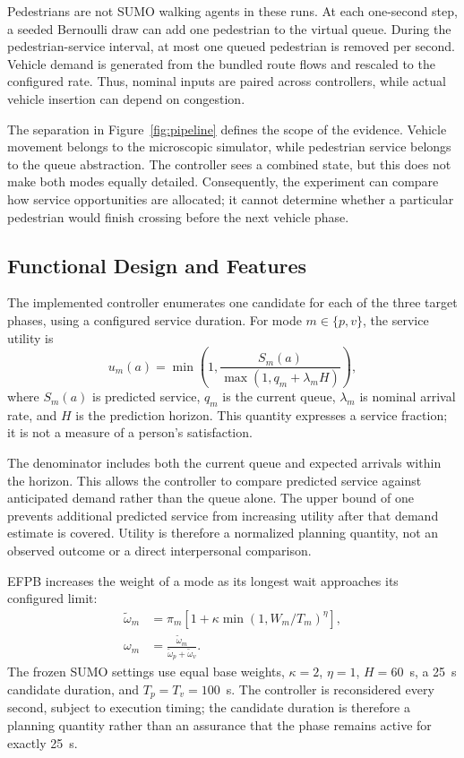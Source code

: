 \documentclass[sigconf]{acmart}
\begin{document}
Pedestrians are not SUMO walking agents in these runs. At each
one-second step, a seeded Bernoulli draw can add one pedestrian to
the virtual queue. During the pedestrian-service interval, at most
one queued pedestrian is removed per second. Vehicle demand is
generated from the bundled route flows and rescaled to the configured
rate. Thus, nominal inputs are paired across controllers, while actual
vehicle insertion can depend on congestion.

The separation in Figure~\ref{fig:pipeline} defines the scope of the
evidence. Vehicle movement belongs to the microscopic simulator,
while pedestrian service belongs to the queue abstraction. The
controller sees a combined state, but this does not make both modes
equally detailed. Consequently, the experiment can compare how
service opportunities are allocated; it cannot determine whether a
particular pedestrian would finish crossing before the next vehicle
phase.

\subsection{Functional Design and Features}
The implemented controller enumerates one candidate for each of the
three target phases, using a configured service duration. For mode
$m\in\{p,v\}$, the service utility is
\begin{equation}
u_m(a)=\min\left(1,\frac{S_m(a)}{\max(1,q_m+\lambda_m H)}\right),
\end{equation}
where $S_m(a)$ is predicted service, $q_m$ is the current queue,
$\lambda_m$ is nominal arrival rate, and $H$ is the prediction
horizon. This quantity expresses a service fraction; it is not a
measure of a person's satisfaction.

The denominator includes both the current queue and expected
arrivals within the horizon. This allows the controller to compare
predicted service against anticipated demand rather than the queue
alone. The upper bound of one prevents additional predicted service
from increasing utility after that demand estimate is covered.
Utility is therefore a normalized planning quantity, not an observed
outcome or a direct interpersonal comparison.

EFPB increases the weight of a mode as its longest wait approaches
its configured limit:
\begin{align}
\widetilde{\omega}_m&=\pi_m
\left[1+\kappa\min(1,W_m/T_m)^\eta\right],\\
\omega_m&=\frac{\widetilde{\omega}_m}
{\widetilde{\omega}_p+\widetilde{\omega}_v}.
\end{align}
The frozen SUMO settings use equal base weights, $\kappa=2$,
$\eta=1$, $H=60$~s, a 25~s candidate duration, and
$T_p=T_v=100$~s. The controller is reconsidered every second, subject
to execution timing; the candidate duration is therefore a planning
quantity rather than an assurance that the phase remains active for
exactly 25~s.
\end{document}
